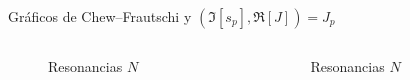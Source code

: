 \documentclass[10pt]{beamer}
\begin{document}

\begin{frame}{Gr\'aficos de Chew--Frautschi y $(\Im[s_p],\Re[J])=J_p$}
\vspace{-2em}
\begin{columns}
  \begin{column}{0.5\textwidth}
  \begin{figure}
	\centering
	\vspace{-0.7em}
	\caption{Resonancias $N$}
  \end{figure}
  \end{column}
  \begin{column}{0.5\textwidth}
  \begin{figure}
	\centering
	\vspace{-0.7em}
	\caption{Resonancias $N$}
  \end{figure}
  \end{column}
\end{columns}
\vspace{-1cm}
\begin{columns}
  \begin{column}{0.5\textwidth}
  \begin{figure}
	\centering

\end{figure}
\end{column}
\end{columns}
\end{frame}
\end{document}

